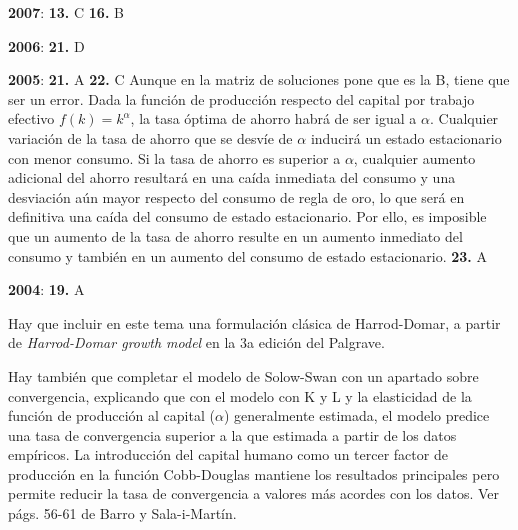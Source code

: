\documentclass{nuevotema}
\begin{document}
\textbf{2007}: \textbf{13.} C \textbf{16.} B

\textbf{2006}: \textbf{21.} D

\textbf{2005}: \textbf{21.} A \textbf{22.} C Aunque en la matriz de soluciones pone que es la B, tiene que ser un error. Dada la función de producción respecto del capital por trabajo efectivo $f(k) = k^\alpha$, la tasa óptima de ahorro habrá de ser igual a $\alpha$. Cualquier variación de la tasa de ahorro que se desvíe de $\alpha$ inducirá un estado estacionario con menor consumo. Si la tasa de ahorro es superior a $\alpha$, cualquier aumento adicional del ahorro resultará en una caída inmediata del consumo y una desviación aún mayor respecto del consumo de regla de oro, lo que será en definitiva una caída del consumo de estado estacionario. Por ello, es imposible que un aumento de la tasa de ahorro resulte en un aumento inmediato del consumo y también en un aumento del consumo de estado estacionario. \textbf{23.} A

\textbf{2004}: \textbf{19.} A


Hay que incluir en este tema una formulación clásica de Harrod-Domar, a partir de \textit{Harrod-Domar growth model} en la 3a edición del Palgrave.

Hay también que completar el modelo de Solow-Swan con un apartado sobre convergencia, explicando que con el modelo con K y L y la elasticidad de la función de producción al capital ($\alpha$) generalmente estimada, el modelo predice una tasa de convergencia superior a la que estimada a partir de los datos empíricos. La introducción del capital humano como un tercer factor de producción en la función Cobb-Douglas mantiene los resultados principales pero permite reducir la tasa de convergencia a valores más acordes con los datos. Ver págs. 56-61 de Barro y Sala-i-Martín.

\bibliografia
\end{document}
